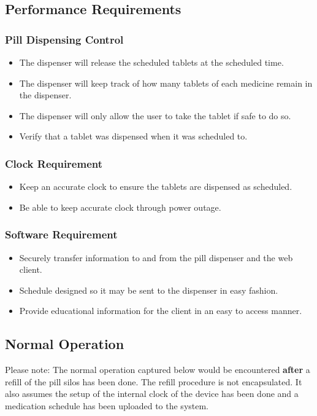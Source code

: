 \documentclass[12pt,titlepage]{article}
\begin{document}
\subsection{Performance Requirements}
\subsubsection{Pill Dispensing Control}
\begin{itemize}
    \item The dispenser will release the scheduled tablets at the scheduled time. 
    \item The dispenser will keep track of how many tablets of each medicine remain in the dispenser.
    \item The dispenser will only allow the user to take the tablet if safe to do so.
    \item Verify that a tablet was dispensed when it was scheduled to.
\end{itemize}
\subsubsection{Clock Requirement}
\begin{itemize}
    \item Keep an accurate clock to ensure the tablets are dispensed as scheduled.
    \item Be able to keep accurate clock through power outage.
\end{itemize}
\subsubsection{Software Requirement}
\begin{itemize}
    \item Securely transfer information to and from the pill dispenser and the web client.
    \item Schedule designed so it may be sent to the dispenser in easy fashion.
    \item Provide educational information for the client in an easy to access manner.
\end{itemize}

\subsection{Normal Operation}
Please note: The normal operation captured below would be encountered \textbf{after} a refill of the pill silos has been done. The refill procedure is not encapsulated. It also assumes the setup of the internal clock of the device has been done and a medication schedule has been uploaded to the system.
\end{document}
